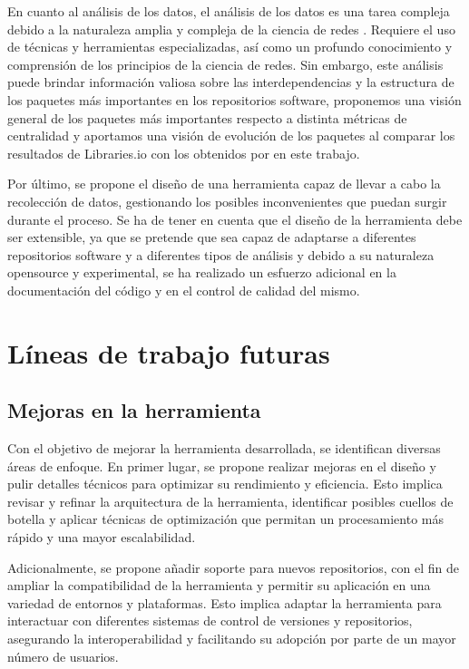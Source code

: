 En cuanto al análisis de los datos, el análisis de los datos es una tarea compleja debido a la naturaleza amplia y compleja de la ciencia de redes \cite{barabasi2016network}.
Requiere el uso de técnicas y herramientas especializadas, así como un profundo conocimiento y comprensión de los principios de la ciencia de redes.
Sin embargo, este análisis puede brindar información valiosa sobre las interdependencias y la estructura de los paquetes más importantes en los repositorios software,
proponemos una visión general de los paquetes más importantes respecto a distinta métricas de centralidad y aportamos una visión de evolución de los paquetes
al comparar los resultados de Libraries.io con los obtenidos por en este trabajo.

Por último, se propone el diseño de una herramienta capaz de llevar a cabo la recolección de datos, gestionando
los posibles inconvenientes que puedan surgir durante el proceso. Se ha de tener en cuenta que el diseño de la herramienta debe ser extensible,
ya que se pretende que sea capaz de adaptarse a diferentes repositorios software y a diferentes tipos de análisis y debido a su
naturaleza opensource y experimental, se ha realizado un esfuerzo adicional en la documentación del código y en el control de calidad del mismo.


\section{Líneas de trabajo futuras}

\subsection{Mejoras en la herramienta}

Con el objetivo de mejorar la herramienta desarrollada, se identifican diversas áreas de enfoque.
En primer lugar, se propone realizar mejoras en el diseño y pulir detalles técnicos para optimizar su rendimiento y eficiencia.
Esto implica revisar y refinar la arquitectura de la herramienta, identificar posibles cuellos de botella y aplicar técnicas de
optimización que permitan un procesamiento más rápido y una mayor escalabilidad.

Adicionalmente, se propone añadir soporte para nuevos repositorios, con el fin de ampliar la compatibilidad de la herramienta y
permitir su aplicación en una variedad de entornos y plataformas. Esto implica adaptar la herramienta para interactuar con
diferentes sistemas de control de versiones y repositorios, asegurando la interoperabilidad y facilitando su adopción por
parte de un mayor número de usuarios.

